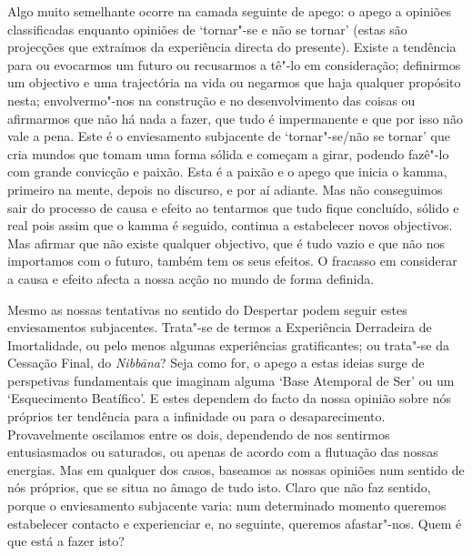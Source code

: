 Algo muito semelhante ocorre na camada seguinte de apego: o apego a opiniões classificadas enquanto opiniões de `tornar"-se e não se tornar' (estas são projecções que extraímos da experiência directa do presente). Existe a tendência para ou evocarmos um futuro ou recusarmos a tê"-lo em consideração; definirmos um objectivo e uma trajectória na vida ou negarmos que haja qualquer propósito nesta; envolvermo"-nos na construção e no desenvolvimento das coisas ou afirmarmos que não há nada a fazer, que tudo é impermanente e que por isso não vale a pena. Este é o enviesamento subjacente de `tornar"-se/não se tornar' que cria mundos que tomam uma forma sólida e começam a girar, podendo fazê"-lo com grande convicção e paixão. Esta é a paixão e o apego que inicia o kamma, primeiro na mente, depois no discurso, e por aí adiante. Mas não conseguimos sair do processo de causa e efeito ao tentarmos que tudo fique concluído, sólido e real pois assim que o kamma é seguido, continua a estabelecer novos objectivos. Mas afirmar que não existe qualquer objectivo, que é tudo vazio e que não nos importamos com o futuro, também tem os seus efeitos. O fracasso em considerar a causa e efeito afecta a nossa acção no mundo de forma definida.

Mesmo as nossas tentativas no sentido do Despertar podem seguir estes enviesamentos subjacentes. Trata"-se de termos a Experiência Derradeira de Imortalidade, ou pelo menos algumas experiências gratificantes; ou trata"-se da Cessação Final, do \emph{Nibbāna}? Seja como for, o apego a estas ideias surge de perspetivas fundamentais que imaginam alguma `Base Atemporal de Ser' ou um `Esquecimento Beatífico'. E estes dependem do facto da nossa opinião sobre nós próprios ter tendência para a infinidade ou para o desaparecimento. Provavelmente oscilamos entre os dois, dependendo de nos sentirmos entusiasmados ou saturados, ou apenas de acordo com a flutuação das nossas energias. Mas em qualquer dos casos, baseamos as nossas opiniões num sentido de nós próprios, que se situa no âmago de tudo isto. Claro que não faz sentido, porque o enviesamento subjacente varia: num determinado momento queremos estabelecer contacto e experienciar e, no seguinte, queremos afastar"-nos. Quem é que está a fazer isto?

